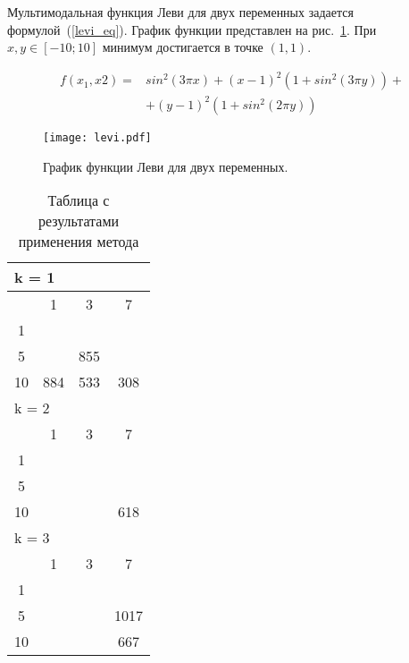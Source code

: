 Мультимодальная функция Леви для двух переменных задается формулой~(\ref{levi_eq}). График функции представлен на рис.~\ref{levi_plot}. При $x, y \in [-10; 10]$ минимум достигается в точке $(1, 1)$.

\begin{equation}
\label{levi_eq}
\begin{split}
f(x_1, x2) = &sin^2(3\pi x) + (x - 1)^2(1 + sin^2(3\pi y)) + \\
& + (y - 1)^2(1 + sin^2(2\pi y))
\end{split}
\end{equation}

\begin{figure}
    \centering
    \texttt{[image: levi.pdf]}
    \caption{График функции Леви для двух переменных.}
    \label{levi_plot}
\end{figure}

\begin{table}
  \centering
  \begin{tabular}{|*4{c|}}
    \hline
    \multicolumn{4}{|l|}{k = 1} \\
    \hline
    \diagbox{$\mu$}{$\lambda$} & \multicolumn{1}{c|}{1} & \multicolumn{1}{c|}{3} & \multicolumn{1}{c|}{7} \\
    \hline
    1& \cellcolor{olive}{3496} & \cellcolor{olive}{1980} & \cellcolor{olive}{1321} \\
    \hline
    5& \cellcolor{olive}{1778} & 855 & \cellcolor{olive}{356} \\
    \hline
    10 & 884 & 533 & 308 \\
    \hline
    \multicolumn{4}{|l|}{k = 2} \\
    \hline
    \diagbox{$\mu$}{$\lambda$} & \multicolumn{1}{c|}{1} & \multicolumn{1}{c|}{3} & \multicolumn{1}{c|}{7} \\
    \hline
    1 & \cellcolor{olive}{4947} & \cellcolor{olive}{2020} & \cellcolor{olive}{1205} \\
    \hline
    5 & \cellcolor{olive}{1935} & \cellcolor{olive}{1085} & \cellcolor{olive}{770} \\
    \hline
    10 & \cellcolor{olive}{1803} & \cellcolor{olive}{887} & 618 \\
    \hline
    \multicolumn{4}{|l|}{k = 3} \\
    \hline
    \diagbox{$\mu$}{$\lambda$} & \multicolumn{1}{c|}{1} & \multicolumn{1}{c|}{3} & \multicolumn{1}{c|}{7} \\
    \hline
    1 & \cellcolor{olive}{5216}& \cellcolor{olive}{2900} & \cellcolor{olive}{1700} \\
    \hline
    5 & \cellcolor{olive}{3105} & \cellcolor{olive}{1808} & 1017 \\
    \hline
    10 & \cellcolor{olive}{2071}& \cellcolor{olive}{1330} & 667 \\
    \hline
  \end{tabular}
  \captionsetup{justification=centering}
  \caption{Таблица с результатами применения метода }
\end{table}

